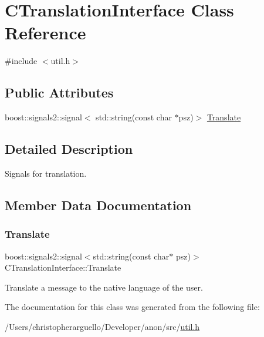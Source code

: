 \hypertarget{class_c_translation_interface}{}\section{C\+Translation\+Interface Class Reference}
\label{class_c_translation_interface}


{\ttfamily \#include $<$util.\+h$>$}

\subsection*{Public Attributes}
\begin{DoxyCompactItemize}
\item 
boost\+::signals2\+::signal$<$ std\+::string(const char $\ast$psz)$>$ \mbox{\hyperlink{class_c_translation_interface_a02eb72aa9d39e6f55944581673af7135}{Translate}}
\end{DoxyCompactItemize}


\subsection{Detailed Description}
Signals for translation. 

\subsection{Member Data Documentation}
\mbox{\label{class_c_translation_interface_a02eb72aa9d39e6f55944581673af7135}} 
\subsubsection{\texorpdfstring{Translate}{Translate}}
{\footnotesize\ttfamily boost\+::signals2\+::signal$<$std\+::string(const char$\ast$ psz)$>$ C\+Translation\+Interface\+::\+Translate}

Translate a message to the native language of the user. 

The documentation for this class was generated from the following file\+:\begin{DoxyCompactItemize}
\item 
/\+Users/christopherarguello/\+Developer/anon/src/\mbox{\hyperlink{util_8h}{util.\+h}}\end{DoxyCompactItemize}
